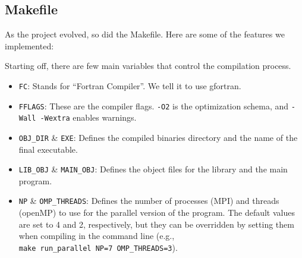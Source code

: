 \subsection{Makefile}\label{makefile}

As the project evolved, so did the Makefile. Here are some of the
features we implemented:

Starting off, there are few main variables that control the compilation
process.

\begin{Shaded}
\begin{Highlighting}[]
       \CharTok{=}
   \CharTok{=}
  \CharTok{=}
      \CharTok{=}\StringTok{ }\CharTok{$(}\CharTok{)}
  \CharTok{=}\StringTok{ }\CharTok{$(}\CharTok{)}\CharTok{\textbackslash{}}
\StringTok{           }\CharTok{$(}\CharTok{)}\CharTok{\textbackslash{}}
 \CharTok{=}\StringTok{ }\CharTok{$(}\CharTok{)}

          
 
\end{Highlighting}
\end{Shaded}

\begin{itemize}
\tightlist
\item
  \texttt{FC}: Stands for ``Fortran Compiler''. We tell it to use
  gfortran.
\item
  \texttt{FFLAGS}: These are the compiler flags. \texttt{-O2} is the
  optimization schema, and \texttt{-Wall\ -Wextra} enables warnings.
\item
  \texttt{OBJ\_DIR} \& \texttt{EXE}: Defines the compiled binaries
  directory and the name of the final executable.
\item
  \texttt{LIB\_OBJ} \& \texttt{MAIN\_OBJ}: Defines the object files for
  the library and the main program.
\item
  \texttt{NP} \& \texttt{OMP\_THREADS}: Defines the number of processes
  (MPI) and threads (openMP) to use for the parallel version of the
  program. The default values are set to 4 and 2, respectively, but they
  can be overridden by setting them when compiling in the command line
  (e.g., \texttt{make\ run\_parallel\ NP=7\ OMP\_THREADS=3}).
\end{itemize}

